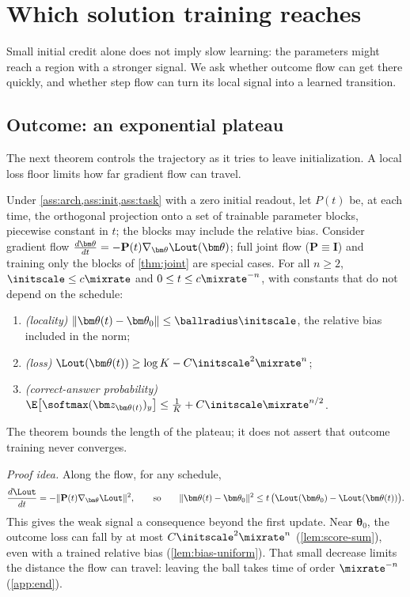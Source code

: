 \section{Which solution training reaches}
\label{sec:reach}

Small initial credit alone does not imply slow learning: the parameters might reach a region with a stronger signal. We ask
whether outcome flow can get there quickly, and whether step flow can turn its local signal into a learned transition.

\subsection{Outcome: an exponential plateau}

The next theorem controls the trajectory as it tries to leave initialization. A local loss floor limits how far gradient flow can travel.

\begin{theorem}
\label{thm:outcome-end}
Under \cref{ass:arch,ass:init,ass:task} with a zero initial readout, let $P(t)$ be, at each time, the orthogonal projection onto a set
of trainable parameter blocks, piecewise constant in $t$; the blocks may include the relative bias. Consider gradient flow
$\tfrac{d\bm\theta}{dt}=-\mathbf P(t)\nabla_{\bm\theta}\Lout(\bm\theta)$; full joint flow ($\mathbf P\equiv\mathbf I$) and training only the blocks of \cref{thm:joint} are special cases.
For all $n\ge2$, $\initscale\le c\mixrate$ and $0\le t\le c\mixrate^{-n}$, with constants that do not depend on the schedule:
\begin{enumerate}[label=(\roman*),leftmargin=*,itemsep=0pt,topsep=2pt]
\item \emph{(locality)} $\|\bm\theta(t)-\bm\theta_0\|\le\ballradius\initscale$, the relative bias included in the norm;
\item \emph{(loss)} $\Lout(\bm\theta(t))\ge\log K-C\initscale^2\mixrate^n$;
\item \emph{(correct-answer probability)} $\E\bigl[\softmax(\bm z_{\bm\theta(t)})_y\bigr]\le\frac{1}{K}+C\initscale\mixrate^{n/2}$.
\end{enumerate}
\end{theorem}
The theorem bounds the length of the plateau; it does not assert that outcome training never converges.

\emph{Proof idea.} Along the flow, for any schedule,
\[
 \frac{d\Lout}{dt}=-\|\mathbf P(t)\nabla_{\bm\theta}\Lout\|^2,
 \qquad\text{so}\qquad
 \|\bm\theta(t)-\bm\theta_0\|^2\le t\,\bigl(\Lout(\bm\theta_0)-\Lout(\bm\theta(t))\bigr).
\]
This gives the weak signal a consequence beyond the first update. Near $\bm\theta_0$, the outcome loss can fall by at most
$C\initscale^2\mixrate^n$ (\cref{lem:score-sum}), even with a trained relative bias (\cref{lem:bias-uniform}). That small decrease limits
the distance the flow can travel: leaving the ball takes time of order $\mixrate^{-n}$ (\cref{app:end}).

